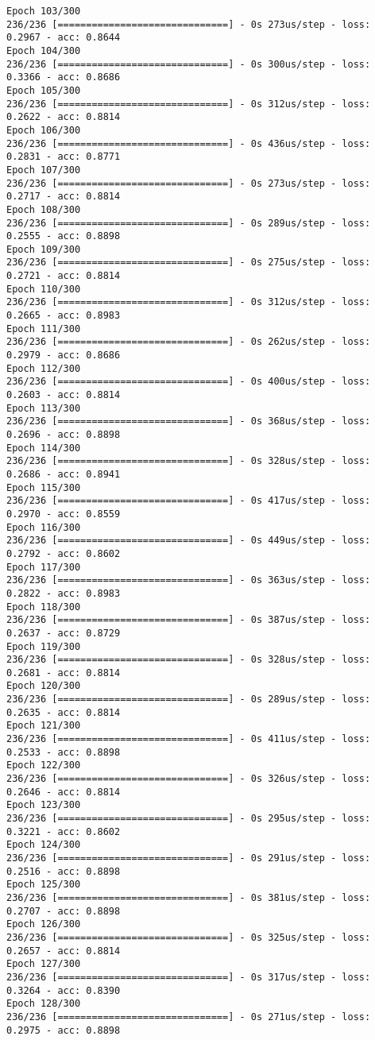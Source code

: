 \documentclass[11pt]{article}
\begin{document}
\begin{Verbatim}[commandchars=\\\{\}]
Epoch 103/300
236/236 [==============================] - 0s 273us/step - loss: 0.2967 - acc: 0.8644
Epoch 104/300
236/236 [==============================] - 0s 300us/step - loss: 0.3366 - acc: 0.8686
Epoch 105/300
236/236 [==============================] - 0s 312us/step - loss: 0.2622 - acc: 0.8814
Epoch 106/300
236/236 [==============================] - 0s 436us/step - loss: 0.2831 - acc: 0.8771
Epoch 107/300
236/236 [==============================] - 0s 273us/step - loss: 0.2717 - acc: 0.8814
Epoch 108/300
236/236 [==============================] - 0s 289us/step - loss: 0.2555 - acc: 0.8898
Epoch 109/300
236/236 [==============================] - 0s 275us/step - loss: 0.2721 - acc: 0.8814
Epoch 110/300
236/236 [==============================] - 0s 312us/step - loss: 0.2665 - acc: 0.8983
Epoch 111/300
236/236 [==============================] - 0s 262us/step - loss: 0.2979 - acc: 0.8686
Epoch 112/300
236/236 [==============================] - 0s 400us/step - loss: 0.2603 - acc: 0.8814
Epoch 113/300
236/236 [==============================] - 0s 368us/step - loss: 0.2696 - acc: 0.8898
Epoch 114/300
236/236 [==============================] - 0s 328us/step - loss: 0.2686 - acc: 0.8941
Epoch 115/300
236/236 [==============================] - 0s 417us/step - loss: 0.2970 - acc: 0.8559
Epoch 116/300
236/236 [==============================] - 0s 449us/step - loss: 0.2792 - acc: 0.8602
Epoch 117/300
236/236 [==============================] - 0s 363us/step - loss: 0.2822 - acc: 0.8983
Epoch 118/300
236/236 [==============================] - 0s 387us/step - loss: 0.2637 - acc: 0.8729
Epoch 119/300
236/236 [==============================] - 0s 328us/step - loss: 0.2681 - acc: 0.8814
Epoch 120/300
236/236 [==============================] - 0s 289us/step - loss: 0.2635 - acc: 0.8814
Epoch 121/300
236/236 [==============================] - 0s 411us/step - loss: 0.2533 - acc: 0.8898
Epoch 122/300
236/236 [==============================] - 0s 326us/step - loss: 0.2646 - acc: 0.8814
Epoch 123/300
236/236 [==============================] - 0s 295us/step - loss: 0.3221 - acc: 0.8602
Epoch 124/300
236/236 [==============================] - 0s 291us/step - loss: 0.2516 - acc: 0.8898
Epoch 125/300
236/236 [==============================] - 0s 381us/step - loss: 0.2707 - acc: 0.8898
Epoch 126/300
236/236 [==============================] - 0s 325us/step - loss: 0.2657 - acc: 0.8814
Epoch 127/300
236/236 [==============================] - 0s 317us/step - loss: 0.3264 - acc: 0.8390
Epoch 128/300
236/236 [==============================] - 0s 271us/step - loss: 0.2975 - acc: 0.8898

\end{Verbatim}
\end{document}
